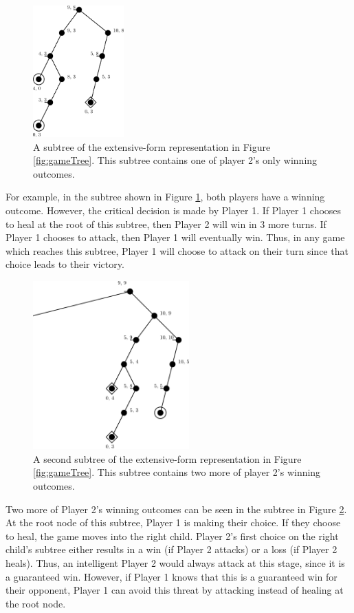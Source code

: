 \begin{figure}[H]
  \centering
  \includegraphics[width=3.5cm]{figures/GameSubtree.png}
  \caption{A subtree of the extensive-form representation in Figure \ref{fig:gameTree}. This subtree contains one of player 2's only winning outcomes.}
  \label{fig:gameSubtree}
\end{figure}

For example, in the subtree shown in Figure \ref{fig:gameSubtree}, both players have a winning outcome. However, the critical decision is made by Player 1. If Player 1 chooses to heal at the root of this subtree, then Player 2 will win in 3 more turns. If Player 1 chooses to attack, then Player 1 will eventually win. Thus, in any game which reaches this subtree, Player 1 will choose to attack on their turn since that choice leads to their victory.\\

\begin{figure}[H]
  \centering
  \includegraphics[width=6cm]{figures/GameSubtree2.png}
  \caption{A second subtree of the extensive-form representation in Figure \ref{fig:gameTree}. This subtree contains two more of player 2's winning outcomes.}
  \label{fig:gameSubtree2}
\end{figure}

Two more of Player 2's winning outcomes can be seen in the subtree in Figure \ref{fig:gameSubtree2}. At the root node of this subtree, Player 1 is making their choice. If they choose to heal, the game moves into the right child. Player 2's first choice on the right child's subtree either results in a win (if Player 2 attacks) or a loss (if Player 2 heals). Thus, an intelligent Player 2 would always attack at this stage, since it is a guaranteed win. However, if Player 1 knows that this is a guaranteed win for their opponent, Player 1 can avoid this threat by attacking instead of healing at the root node.\\

